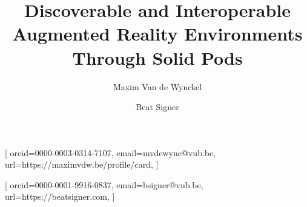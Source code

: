 \documentclass[
]{ceurart}
\begin{document}

\title{Discoverable and Interoperable Augmented Reality Environments Through Solid Pods}


\author{Maxim {Van de Wynckel}}[%
orcid=0000-0003-0314-7107,
email=mvdewync@vub.be,
url=https://maximvdw.be/profile/card,
]
\cormark[1]
\address{Web \& Information Systems Engineering Lab, Vrije Universiteit Brussel, 1050 Brussels, Belgium}

\author{Beat Signer}[%
orcid=0000-0001-9916-0837,
email=bsigner@vub.be,
url=https://beatsigner.com,
]




\maketitle





\end{document}
